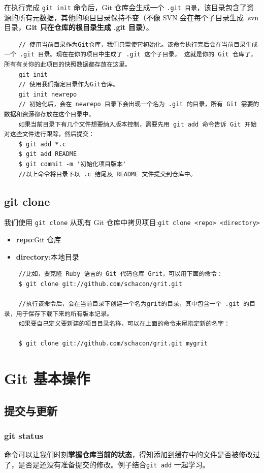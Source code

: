 \documentclass[UTF8,a4paper,12pt]{ctexbook}
\begin{document}
		  在执行完成 \verb|git init| 命令后，Git 仓库会生成一个 \verb|.git 目录|，该目录包含了资源的所有元数据，其他的项目目录保持不变（不像 SVN 会在每个子目录生成 .svn 目录，\textbf{Git 只在仓库的根目录生成 .git 目录}）。
		  \begin{lstlisting}
	// 使用当前目录作为Git仓库，我们只需使它初始化。该命令执行完后会在当前目录生成一个 .git 目录。现在在你的项目中生成了 .git 这个子目录。 这就是你的 Git 仓库了，所有有关你的此项目的快照数据都存放在这里。
	git init
	// 使用我们指定目录作为Git仓库。 
	git init newrepo
	// 初始化后，会在 newrepo 目录下会出现一个名为 .git 的目录，所有 Git 需要的数据和资源都存放在这个目录中。
	如果当前目录下有几个文件想要纳入版本控制，需要先用 git add 命令告诉 Git 开始对这些文件进行跟踪，然后提交： 
	$ git add *.c
	$ git add README
	$ git commit -m '初始化项目版本'
	//以上命令将目录下以 .c 结尾及 README 文件提交到仓库中。
		  \end{lstlisting}
		
	\section{git clone}
		我们使用 \verb|git clone| 从现有 Git 仓库中拷贝项目:\verb|git clone <repo> <directory>|
			\begin{itemize}[itemindent = 1em]
				\item \textbf{repo}:Git 仓库
				\item \textbf{directory}:本地目录
			\end{itemize}
		 
		 \begin{lstlisting}
	//比如，要克隆 Ruby 语言的 Git 代码仓库 Grit，可以用下面的命令： 
	$ git clone git://github.com/schacon/grit.git
	
	//执行该命令后，会在当前目录下创建一个名为grit的目录，其中包含一个 .git 的目录，用于保存下载下来的所有版本记录。 
	如果要自己定义要新建的项目目录名称，可以在上面的命令末尾指定新的名字：
	
	$ git clone git://github.com/schacon/grit.git mygrit
		 \end{lstlisting} 
  \chapter{Git 基本操作}
	  \section{提交与更新}
		  \subsection{git status}
			  命令可以让我们时刻\textbf{掌握仓库当前的状态}，得知添加到缓存中的文件是否被修改过了，是否是还没有准备提交的修改。例子结合\verb|git add| 一起学习。
			  
\end{document}
